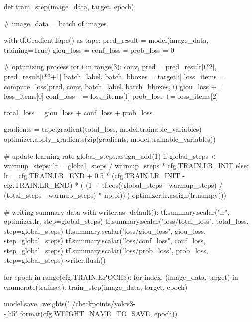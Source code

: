 \documentclass[10pt,a4paper]{article}
\begin{document}
\begin{py}
def train_step(image_data, target, epoch):

    # image_data = batch of images

    with tf.GradientTape() as tape:
        pred_result = model(image_data, training=True)
        giou_loss = conf_loss = prob_loss = 0

        # optimizing process
        for i in range(3):
            conv, pred = pred_result[i*2], pred_result[i*2+1]
            batch_label, batch_bboxes = target[i]
            loss_items = compute_loss(pred, conv, batch_label, batch_bboxes, i)
            giou_loss += loss_items[0]
            conf_loss += loss_items[1]
            prob_loss += loss_items[2]

        total_loss = giou_loss + conf_loss + prob_loss

        gradients = tape.gradient(total_loss, model.trainable_variables)
        optimizer.apply_gradients(zip(gradients, model.trainable_variables))

        # update learning rate
        global_steps.assign_add(1)
        if global_steps < warmup_steps:
            lr = global_steps / warmup_steps * cfg.TRAIN.LR_INIT
        else:
            lr = cfg.TRAIN.LR_END + 0.5 * (cfg.TRAIN.LR_INIT - cfg.TRAIN.LR_END) * (
                (1 + tf.cos((global_steps - warmup_steps) / (total_steps - warmup_steps) * np.pi))
            )
        optimizer.lr.assign(lr.numpy())

        # writing summary data
        with writer.as_default():
            tf.summary.scalar("lr", optimizer.lr, step=global_steps)
            tf.summary.scalar("loss/total_loss", total_loss, step=global_steps)
            tf.summary.scalar("loss/giou_loss", giou_loss, step=global_steps)
            tf.summary.scalar("loss/conf_loss", conf_loss, step=global_steps)
            tf.summary.scalar("loss/prob_loss", prob_loss, step=global_steps)
        writer.flush()

for epoch in range(cfg.TRAIN.EPOCHS):
    for index, (image_data, target) in enumerate(trainset):
        train_step(image_data, target, epoch)

    model.save_weights("./checkpoints/yolov3-{}-{}.h5".format(cfg.WEIGHT_NAME_TO_SAVE, epoch))
\end{py}
\end{document}
